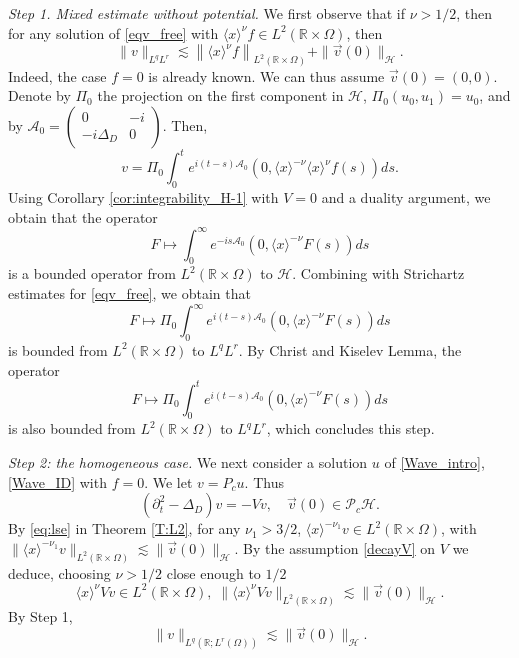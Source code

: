\documentclass[10pt,leqno]{amsart}
\theoremstyle{definition}%
\theoremstyle{remark}
\numberwithin{equation}{section}
\newcommand{\R}{\mathbb{R}}
\renewcommand{\^}{\widehat}%
\newcommand{\la}{\langle}
\newcommand{\ra}{\rangle}
\newcommand{\AAA}{\mathcal{A}}
\newcommand{\HHH}{\mathcal{H}}
\newcommand{\PPP}{\mathcal{P}}
\begin{document}
\noindent\emph{Step 1. Mixed estimate without potential.} We first observe that if $\nu>1/2$, then for any solution of \eqref{eqv_free} with $\la x \ra^{\nu}f\in L^2(\R\times\Omega)$, then
\begin{equation}
\label{mixed_Delta_D}
\|v\|_{L^qL^r}\lesssim \left\|\la x \ra^{\nu} f\right\|_{L^2(\R\times \Omega)}+\|\vec{v}(0)\|_{\HHH}. 
\end{equation}
Indeed, the case $f=0$ is already known. We can thus assume $\vec{v}(0)=(0,0)$. Denote by $\Pi_0$ the projection on the first component in $\HHH$, $\Pi_0(u_0,u_1)=u_0$, and by
$\mathcal{A}_0=\begin{pmatrix} 
0 & -i \\
-i\Delta_D & 0
\end{pmatrix}$. Then,%
$$v=\Pi_0\int_0^{t}e^{i(t-s)\AAA_0}\left( 0,\la x\ra^{-\nu} \la x\ra^{\nu}f(s) \right)ds.$$
Using Corollary \ref{cor:integrability_H-1} with $V=0$ and a duality argument, we obtain that the operator 
$$ F\mapsto \int_0^{\infty} e^{-is\AAA_0}\left( 0,\la x\ra^{-\nu}F(s) \right)ds$$ 
is a bounded operator from $L^2(\R\times\Omega)$ to $\HHH$. Combining with Strichartz estimates for \eqref{eqv_free}, we obtain that
$$ F\mapsto \Pi_0\int_0^{\infty} e^{i(t-s)\AAA_0}\left( 0,\la x\ra^{-\nu}F(s) \right)ds$$
is bounded from $L^2(\R\times \Omega)$ to $L^qL^r$. By Christ and Kiselev Lemma, the operator 
$$ F\mapsto \Pi_0\int_0^{t} e^{i(t-s)\AAA_0}\left( 0,\la x\ra^{-\nu}F(s) \right)ds$$
is also bounded from $L^2(\R\times \Omega)$ to $L^qL^r$, which concludes this step. 

\smallskip

\noindent\emph{Step 2: the homogeneous case.} We next consider a solution $u$ of \eqref{Wave_intro}, \eqref{Wave_ID} with $f=0$. We let $v=P_cu$. Thus
$$ (\partial_t^2-\Delta_D)v=-Vv,\quad \vec{v}(0)\in \PPP_c\HHH.$$
By \eqref{eq:lse} in Theorem \ref{T:L2}, for any $\nu_1>3/2$, $\la x\ra^{-\nu_1}v\in L^2(\R\times \Omega)$, with $\|\la x\ra^{-\nu_1}v\|_{L^2(\R\times \Omega)}\lesssim \|\vec{v}(0)\|_{\HHH}$. By the assumption \eqref{decayV} on $V$ we deduce, choosing $\nu>1/2$ close enough to $1/2$
$$ \la x\ra^{\nu} V v\in L^2(\R\times \Omega),\;
\|\la x\ra^{\nu}V v\|_{L^2(\R\times \Omega)}\lesssim \|\vec{v}(0)\|_{\HHH}.$$
By Step 1,
$$\|v\|_{L^q(\R;L^r(\Omega))} \lesssim \|\vec{v}(0)\|_{\HHH}.$$

\smallskip
\end{document}
